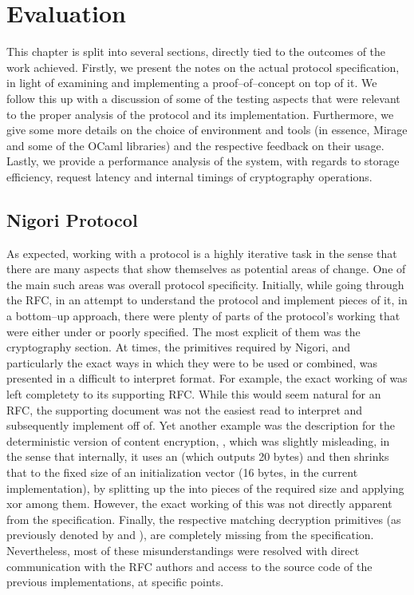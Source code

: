 \chapter{Evaluation} \label{chapter:evaluation}
This chapter is split into several sections, directly tied to the outcomes of the work achieved.
Firstly, we present the notes on the actual protocol specification, in light of examining and implementing a proof--of--concept on top of it.
We follow this up with a discussion of some of the testing aspects that were relevant to the proper analysis of the protocol and its implementation.
Furthermore, we give some more details on the choice of environment and tools (in essence, Mirage and some of the OCaml libraries) and the respective feedback on their usage.
Lastly, we provide a performance analysis of the system, with regards to storage efficiency, request latency and internal timings of cryptography operations.

\section{Nigori Protocol} \label{sec:evaluation:protocol}
As expected, working with a \wip protocol is a highly iterative task in the sense that there are many aspects that show themselves as potential areas of change.
One of the main such areas was overall protocol specificity.
Initially, while going through the RFC, in an attempt to understand the protocol and implement pieces of it, in a bottom--up approach, there were plenty of parts of the protocol's working that were either under or poorly specified.
The most explicit of them was the cryptography section.
At times, the primitives required by Nigori, and particularly the exact ways in which they were to be used or combined, was presented in a difficult to interpret format.
For example, the exact working of  was left completety to its supporting RFC.
While this would seem natural for an RFC, the supporting document was not the easiest read to interpret and subsequently implement off of.
Yet another example was the description for the deterministic version of content encryption, , which was slightly misleading, in the sense that internally, it uses an  (which outputs 20 bytes) and then shrinks that to the fixed size of an  initialization vector (16 bytes, in the current implementation), by splitting up the  into pieces of the required size and applying xor among them.
However, the exact working of this was not directly apparent from the specification.
Finally, the respective matching decryption primitives (as previously denoted by  and ), are completely missing from the specification.
Nevertheless, most of these misunderstandings were resolved with direct communication with the RFC authors and access to the source code of the previous implementations, at specific points.

